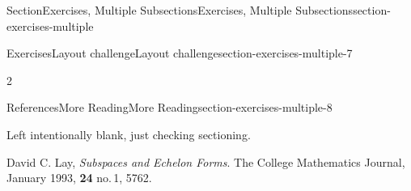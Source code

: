 \documentclass[twoside,10pt,]{article}
\numberwithin{equation}{section}
\begin{document}
\begin{sectionptx}{Section}{Exercises, Multiple Subsections}{}{Exercises, Multiple Subsections}{}{}{section-exercises-multiple}
\begin{exercises-subsection}{Exercises}{Layout challenge}{}{Layout challenge}{}{}{section-exercises-multiple-7}
\begin{exercisegroupcol}{2}
\end{exercisegroupcol}
\par\medskip\noindent
\end{exercises-subsection}
%
%
\typeout{************************************************}
\typeout{************************************************}
%
\begin{references-subsection}{References}{More Reading}{}{More Reading}{}{}{section-exercises-multiple-8}
\begin{introduction}{}%
Left intentionally blank, just checking sectioning.%
\end{introduction}%
\begin{referencelist}
\hypertarget{biblio-lay-article-repeat1}{}David C. Lay, \textit{Subspaces and Echelon Forms}. The College Mathematics Journal, January 1993, \textbf{24} no.\@\,1, 57\textendash{}62.
\end{referencelist}
\end{references-subsection}
\end{sectionptx}
%
%
\typeout{************************************************}
\typeout{************************************************}
%
\end{document}
